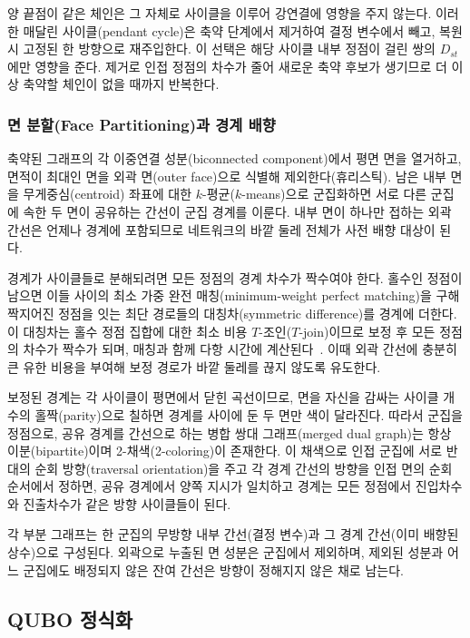 \documentclass[twocolumn,a4paper]{article}
\begin{document}
양 끝점이 같은 체인은 그 자체로 사이클을 이루어 강연결에 영향을 주지 않는다. 이러한 매달린 사이클(pendant cycle)은 축약 단계에서 제거하여 결정 변수에서 빼고, 복원 시 고정된 한 방향으로 재주입한다. 이 선택은 해당 사이클 내부 정점이 걸린 쌍의 \(D_{st}\)에만 영향을 준다. 제거로 인접 정점의 차수가 줄어 새로운 축약 후보가 생기므로 더 이상 축약할 체인이 없을 때까지 반복한다.

\subsubsection*{면 분할(Face Partitioning)과 경계 배향}

축약된 그래프의 각 이중연결 성분(biconnected component)에서 평면 면을 열거하고, 면적이 최대인 면을 외곽 면(outer face)으로 식별해 제외한다(휴리스틱). 남은 내부 면을 무게중심(centroid) 좌표에 대한 \(k\)-평균(\(k\)-means)으로 군집화하면 서로 다른 군집에 속한 두 면이 공유하는 간선이 군집 경계를 이룬다. 내부 면이 하나만 접하는 외곽 간선은 언제나 경계에 포함되므로 네트워크의 바깥 둘레 전체가 사전 배향 대상이 된다.

경계가 사이클들로 분해되려면 모든 정점의 경계 차수가 짝수여야 한다. 홀수인 정점이 남으면 이들 사이의 최소 가중 완전 매칭(minimum-weight perfect matching)을 구해 짝지어진 정점을 잇는 최단 경로들의 대칭차(symmetric difference)를 경계에 더한다. 이 대칭차는 홀수 정점 집합에 대한 최소 비용 \(T\)-조인(\(T\)-join)이므로 보정 후 모든 정점의 차수가 짝수가 되며, 매칭과 함께 다항 시간에 계산된다~\cite{edmonds1973matching}. 이때 외곽 간선에 충분히 큰 유한 비용을 부여해 보정 경로가 바깥 둘레를 끊지 않도록 유도한다.

보정된 경계는 각 사이클이 평면에서 닫힌 곡선이므로, 면을 자신을 감싸는 사이클 개수의 홀짝(parity)으로 칠하면 경계를 사이에 둔 두 면만 색이 달라진다. 따라서 군집을 정점으로, 공유 경계를 간선으로 하는 병합 쌍대 그래프(merged dual graph)는 항상 이분(bipartite)이며 2-채색(2-coloring)이 존재한다. 이 채색으로 인접 군집에 서로 반대의 순회 방향(traversal orientation)을 주고 각 경계 간선의 방향을 인접 면의 순회 순서에서 정하면, 공유 경계에서 양쪽 지시가 일치하고 경계는 모든 정점에서 진입차수와 진출차수가 같은 방향 사이클들이 된다.

각 부분 그래프는 한 군집의 무방향 내부 간선(결정 변수)과 그 경계 간선(이미 배향된 상수)으로 구성된다. 외곽으로 누출된 면 성분은 군집에서 제외하며, 제외된 성분과 어느 군집에도 배정되지 않은 잔여 간선은 방향이 정해지지 않은 채로 남는다.

\subsection{QUBO 정식화} \label{subsec:method_qubo}
\end{document}
